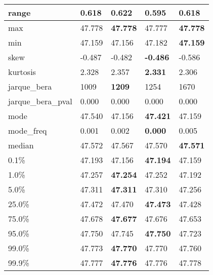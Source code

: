 \begin{table}[H]
\begin{tabular}{|l|m{10em}|m{10em}|m{10em}|m{10em}|}
\hline range & 0.618 & 0.622 & \cellcolor[rgb]{0.9, 0.54, 0.52} 0.595 & \bfseries 0.618 \\
\hline max & 47.778 & \bfseries 47.778 & \cellcolor[rgb]{0.9, 0.54, 0.52} 47.777 & \bfseries 47.778 \\
\hline min & 47.159 & 47.156 & \cellcolor[rgb]{0.9, 0.54, 0.52} 47.182 & \bfseries 47.159 \\
\hline skew & -0.487 & -0.482 & \bfseries -0.486 & \cellcolor[rgb]{0.9, 0.54, 0.52} -0.586 \\
\hline kurtosis & 2.328 & \cellcolor[rgb]{0.9, 0.54, 0.52} 2.357 & \bfseries 2.331 & 2.306 \\
\hline jarque\_bera & 1009 & \bfseries 1209 & 1254 & \cellcolor[rgb]{0.9, 0.54, 0.52} 1670 \\
\hline jarque\_bera\_pval & 0.000 & 0.000 & 0.000 & 0.000 \\
\hline mode & 47.540 & \cellcolor[rgb]{0.9, 0.54, 0.52} 47.156 & \bfseries 47.421 & 47.159 \\
\hline mode\_freq & 0.001 & 0.002 & \bfseries 0.000 & \cellcolor[rgb]{0.9, 0.54, 0.52} 0.005 \\
\hline median & 47.572 & \cellcolor[rgb]{0.9, 0.54, 0.52} 47.567 & 47.570 & \bfseries 47.571 \\
\hline 0.1\% & 47.193 & \cellcolor[rgb]{0.9, 0.54, 0.52} 47.156 & \bfseries 47.194 & 47.159 \\
\hline 1.0\% & 47.257 & \bfseries 47.254 & 47.252 & \cellcolor[rgb]{0.9, 0.54, 0.52} 47.192 \\
\hline 5.0\% & 47.311 & \bfseries 47.311 & 47.310 & \cellcolor[rgb]{0.9, 0.54, 0.52} 47.256 \\
\hline 25.0\% & 47.472 & 47.470 & \bfseries 47.473 & \cellcolor[rgb]{0.9, 0.54, 0.52} 47.428 \\
\hline 75.0\% & 47.678 & \bfseries 47.677 & 47.676 & \cellcolor[rgb]{0.9, 0.54, 0.52} 47.653 \\
\hline 95.0\% & 47.750 & 47.745 & \bfseries 47.750 & \cellcolor[rgb]{0.9, 0.54, 0.52} 47.723 \\
\hline 99.0\% & 47.773 & \bfseries 47.770 & 47.770 & \cellcolor[rgb]{0.9, 0.54, 0.52} 47.760 \\
\hline 99.9\% & 47.777 & \bfseries 47.776 & \cellcolor[rgb]{0.9, 0.54, 0.52} 47.776 & 47.778 \\
\hline
\end{tabular}
\end{table}
